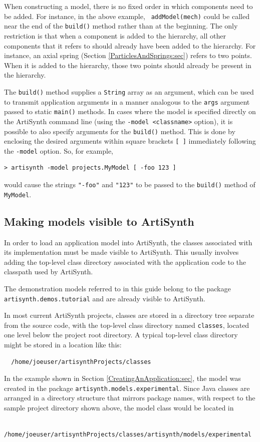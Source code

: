 When constructing a model, there is no fixed order in which components
need to be added. For instance, in the above example, {\tt
addModel(mech)} could be called near the end of the {\tt build()}
method rather than at the beginning. The only restriction is that when
a component is added to the hierarchy, all other components that it
refers to should already have been added to the hierarchy. For
instance, an axial spring (Section \ref{ParticlesAndSprings:sec})
refers to two points. When it is added to the hierarchy, those two
points should already be present in the hierarchy.

The {\tt build()} method supplies a {\tt String} array as an argument,
which can be used to transmit application arguments in a manner
analogous to the {\tt args} argument passed to static {\tt main()}
methods. In cases where the model is specified directly on the
ArtiSynth command line (using the {\tt -model <classname>} option), it
is possible to also specify arguments for the {\tt build()} method.
This is done by enclosing the desired
arguments within square brackets {\tt [ ]} immediately following the
{\tt -model} option. So, for example,
%
\begin{verbatim}
> artisynth -model projects.MyModel [ -foo 123 ]
\end{verbatim}
%
would cause the strings {\tt "-foo"} and {\tt "123"} to
be passed to the {\tt build()} method of {\tt MyModel}.

\subsection{Making models visible to ArtiSynth}

In order to load an application model into ArtiSynth, the classes
associated with its implementation must be made visible to ArtiSynth.
This usually involves adding the top-level class directory associated
with the application code to the classpath used by ArtiSynth.

\begin{sideblock}
The demonstration models referred to in this guide belong to the
package {\tt artisynth.demos.tutorial} and are already visible to
ArtiSynth.
\end{sideblock}

In most current ArtiSynth projects, classes are stored in
a directory tree separate from the source code, with the top-level
class directory named {\tt classes}, located one level below
the project root directory. A typical top-level class directory
might be stored in a location like this:
\begin{verbatim}
  /home/joeuser/artisynthProjects/classes
\end{verbatim}
In the example shown in Section \ref{CreatingAnApplication:sec}, the
model was created in the package {\tt artisynth.models.experimental}.
Since Java classes are arranged in a directory structure that mirrors
package names, with respect to the sample project directory shown
above, the model class would be located in
\begin{verbatim}
  /home/joeuser/artisynthProjects/classes/artisynth/models/experimental
\end{verbatim}

